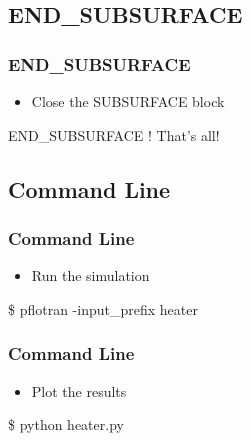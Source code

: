 \documentclass{beamer}
\newcommand\bluecomment[1]{{{\color{blue} #1}}}
\begin{document}
\subsection{END\_SUBSURFACE}
\begin{frame}[fragile]\frametitle{END\_SUBSURFACE}

\begin{itemize}
  \item Close the SUBSURFACE block
\end{itemize}

\begin{semiverbatim}
END_SUBSURFACE \bluecomment{! That's all!}
\end{semiverbatim}
\end{frame}

\subsection{Command Line}
\begin{frame}[fragile]\frametitle{Command Line}

\begin{itemize}
  \item Run the simulation
\end{itemize}

\begin{semiverbatim}
\$ pflotran -input_prefix heater
\end{semiverbatim}

\end{frame}

\begin{frame}[fragile]\frametitle{Command Line}

\begin{itemize}
  \item Plot the results
\end{itemize}

\begin{semiverbatim}
\$ python heater.py
\end{semiverbatim}

\end{frame}

\end{document}
